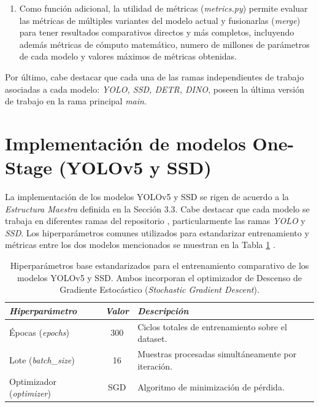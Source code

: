 \begin{enumerate}
    \item Como función adicional, la utilidad de métricas (\textit{metrics.py}) permite evaluar las métricas de múltiples variantes del modelo actual y fusionarlas (\textit{merge}) para tener resultados comparativos directos y más completos, incluyendo además métricas de cómputo matemático, numero de millones de parámetros de cada modelo y valores máximos de métricas obtenidas.
\end{enumerate}

Por último, cabe destacar que cada una de las ramas independientes de trabajo asociadas a cada modelo: \textit{YOLO, SSD, DETR, DINO}, poseen la última versión de trabajo en la rama principal \textit{main}. 

\clearpage


\section{Implementación de modelos One-Stage (YOLOv5 y SSD)}

La implementación de los modelos YOLOv5 y SSD se rigen de acuerdo a la \textit{Estructura Maestra} definida en la Sección 3.3. Cabe destacar que cada modelo se trabaja en diferentes ramas del repositorio \cite{repo_fernando2024}, particularmente las ramas \textit{YOLO} y \textit{SSD}. Los hiperparámetros comunes utilizados para estandarizar entrenamiento y métricas entre los dos modelos mencionados se muestran en la Tabla \ref{tab:3.4-one_stage_hyperparameters} .\\

\begin{table}[H]
    \centering
    \caption{Hiperparámetros base estandarizados para el entrenamiento comparativo de los modelos YOLOv5 y SSD. Ambos incorporan el optimizador de Descenso de Gradiente Estocástico (\textit{Stochastic Gradient Descent}).}
    \begin{tabular}{|l|c|l|}
        \hline
        \textit{Hiperparámetro} & \textit{Valor} & \textit{Descripción} \\
        \hline
        Épocas (\textit{epochs}) & 300 & Ciclos totales de entrenamiento sobre el dataset. \\
        \hline
        Lote (\textit{batch\_size}) & 16 & Muestras procesadas simultáneamente por iteración. \\
        \hline
        Optimizador (\textit{optimizer})& SGD & Algoritmo de minimización de pérdida. \\
        \hline
    \end{tabular}
    \label{tab:3.4-one_stage_hyperparameters}
\end{table}


